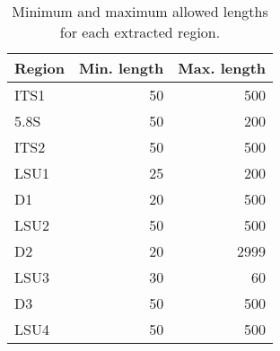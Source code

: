 \documentclass[
]{article}
\begin{document}
\listoftables

\newpage

\FloatBarrier

\begin{table}

\caption{\label{tab:region-limits}Minimum and maximum allowed lengths for each extracted region.}
\centering
\begin{tabular}[t]{lrr}
\toprule
Region & Min. length & Max. length\\
\midrule
ITS1 & 50 & 500\\
5.8S & 50 & 200\\
ITS2 & 50 & 500\\
LSU1 & 25 & 200\\
D1 & 20 & 500\\
\addlinespace
LSU2 & 50 & 500\\
D2 & 20 & 2999\\
LSU3 & 30 & 60\\
D3 & 50 & 500\\
LSU4 & 50 & 500\\
\bottomrule
\end{tabular}
\end{table}
\end{document}
